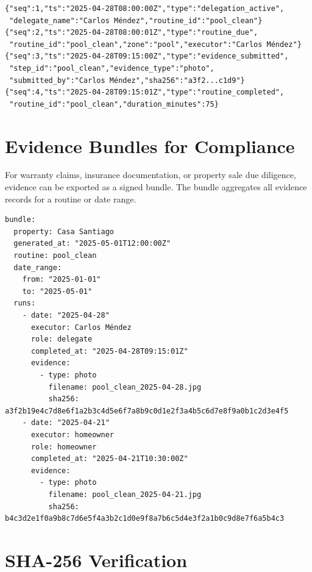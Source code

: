\begin{verbatim}
{"seq":1,"ts":"2025-04-28T08:00:00Z","type":"delegation_active",
 "delegate_name":"Carlos Méndez","routine_id":"pool_clean"}
{"seq":2,"ts":"2025-04-28T08:00:01Z","type":"routine_due",
 "routine_id":"pool_clean","zone":"pool","executor":"Carlos Méndez"}
{"seq":3,"ts":"2025-04-28T09:15:00Z","type":"evidence_submitted",
 "step_id":"pool_clean","evidence_type":"photo",
 "submitted_by":"Carlos Méndez","sha256":"a3f2...c1d9"}
{"seq":4,"ts":"2025-04-28T09:15:01Z","type":"routine_completed",
 "routine_id":"pool_clean","duration_minutes":75}
\end{verbatim}

\section{Evidence Bundles for Compliance}
\label{sec:evidence-bundles}

For warranty claims, insurance documentation, or property sale due diligence, evidence can
be exported as a signed bundle. The bundle aggregates all evidence records for a routine or
date range.

\begin{verbatim}
bundle:
  property: Casa Santiago
  generated_at: "2025-05-01T12:00:00Z"
  routine: pool_clean
  date_range:
    from: "2025-01-01"
    to: "2025-05-01"
  runs:
    - date: "2025-04-28"
      executor: Carlos Méndez
      role: delegate
      completed_at: "2025-04-28T09:15:01Z"
      evidence:
        - type: photo
          filename: pool_clean_2025-04-28.jpg
          sha256: a3f2b19e4c7d8e6f1a2b3c4d5e6f7a8b9c0d1e2f3a4b5c6d7e8f9a0b1c2d3e4f5
    - date: "2025-04-21"
      executor: homeowner
      role: homeowner
      completed_at: "2025-04-21T10:30:00Z"
      evidence:
        - type: photo
          filename: pool_clean_2025-04-21.jpg
          sha256: b4c3d2e1f0a9b8c7d6e5f4a3b2c1d0e9f8a7b6c5d4e3f2a1b0c9d8e7f6a5b4c3
\end{verbatim}

\section{SHA-256 Verification}
\label{sec:evidence-sha256}


